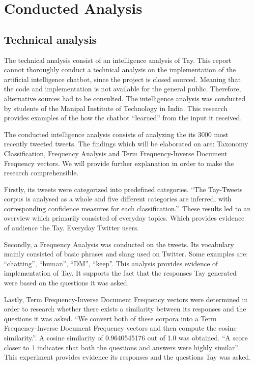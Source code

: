 \chapter{Conducted Analysis}

\section{Technical analysis}
The technical analysis consist of an intelligence analysis of Tay. This report cannot thoroughly conduct a technical analysis on the implementation of the artificial intelligence chatbot, since the project is closed sourced. Meaning that the code and implementation is not available for the general public. Therefore, alternative sources had to be consulted. The intelligence analysis was conducted by students of the Manipal Institute of Technology in India. This research provides examples of the how the chatbot “learned” from the input it received.

The conducted intelligence analysis consists of analyzing the its 3000 most recently tweeted tweets. The findings which will be elaborated on are: Taxonomy Classification, Frequency Analysis and Term Frequency-Inverse Document Frequency vectors. We will provide further explanation in order to make the research comprehensible.

Firstly, its tweets were categorized into predefined categories. “The Tay-Tweets corpus is analysed as a whole and five different categories are inferred, with corresponding confidence measures for each classification.”\cite{IntelligenceAnalysis}. These results led to an overview which primarily consisted of everyday topics. Which provides evidence of audience the Tay. Everyday Twitter users.

Secondly, a Frequency Analysis was conducted on the tweets. Its vocabulary mainly consisted of basic phrases and slang used on Twitter. Some examples are: “chatting”, “human”, “DM”, “keep”\cite{IntelligenceAnalysis}. This analysis provides evidence of implementation of Tay. It supports the fact that the responses Tay generated were based on the questions it was asked.

Lastly, Term Frequency-Inverse Document Frequency vectors were determined in order to research whether there exists a similarity between its responses and the questions it was asked. “We convert both of these corpora into a Term Frequency-Inverse Document Frequency vectors and then compute the cosine similarity.”\cite{IntelligenceAnalysis}. A cosine similarity of 0.9640545176 out of 1.0 was obtained. “A score closer to 1 indicates that both the questions and answers were highly similar”\cite{IntelligenceAnalysis}. This experiment provides evidence its responses and the questions Tay was asked.

